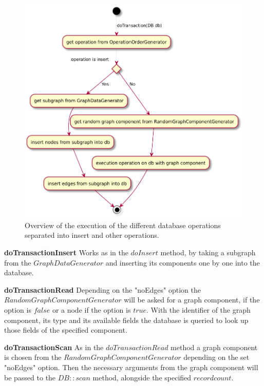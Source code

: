 \begin{figure}[h!]
  \includegraphics[width=\textwidth]{images/extensions/graphWorkloadExecution}
  \caption{Overview of the execution of the different database operations separated into insert and other operations.}
  \label{fig:graphWorkloadExecution}
\end{figure}

\textbf{doTransactionInsert} \newline
Works as in the $ doInsert $ method,
by taking a subgraph from the \linebreak
$ GraphDataGenerator $ and inserting its components one by one into the database.

\textbf{doTransactionRead}
Depending on the "noEdges" option the \linebreak
$ RandomGraphComponentGenerator $ will be asked for a graph component,
if the option is $ false $ or a node if the option is $ true $.
With the identifier of the graph component,
its type and its available fields the database is queried to look up those fields of the specified component.

\textbf{doTransactionScan} \newline
As in the $ doTransactionRead $ method a graph component is chosen from the \linebreak
$ RandomGraphComponentGenerator $ depending on the set "noEdges" option.
Then the necessary arguments from the graph component will be passed to the $ DB::scan $ method,
alongside the specified $ recordcount $.

